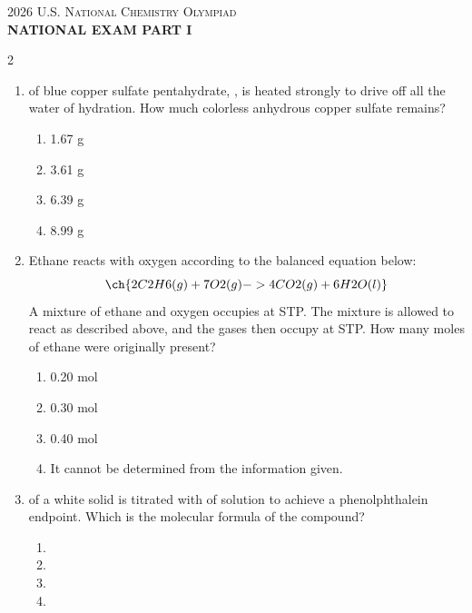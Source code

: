 \documentclass[10pt,letterpaper]{article}
\begin{document}
\begin{center}
    \textsc{\large 2026 U.S. National Chemistry Olympiad}\\
    \Large\textbf{NATIONAL EXAM PART I}
\end{center}
\vspace{0.2cm}

\begin{multicols*}{2}

\begin{enumerate}

    \item {} of blue copper sulfate pentahydrate, , is heated strongly to drive off all the water of hydration. How much colorless anhydrous copper sulfate remains?
    \begin{enumerate}[label=(\textsubscript{\Alph*})]
        \item 1.67 g
        \item 3.61 g
        \item 6.39 g
        \item 8.99 g
    \end{enumerate}

    \item Ethane reacts with oxygen according to the balanced equation below:
    \[ \ch{2 C2H6(g) + 7 O2(g) -> 4 CO2(g) + 6 H2O(l)} \]
    A mixture of ethane and oxygen occupies  at STP. The mixture is allowed to react as described above, and the gases then occupy  at STP. How many moles of ethane were originally present?
    \begin{enumerate}[label=(\textsubscript{\Alph*})]
        \item 0.20 mol
        \item 0.30 mol
        \item 0.40 mol
        \item It cannot be determined from the information given.
    \end{enumerate}

    \item {} of a white solid is titrated with  of   solution to achieve a phenolphthalein endpoint. Which is the molecular formula of the compound?
    \begin{enumerate}[label=(\textsubscript{\Alph*})]
        \item {}
        \item {}
        \item {}
        \item {}
    \end{enumerate}


\end{enumerate}
\end{multicols*}
\end{document}
